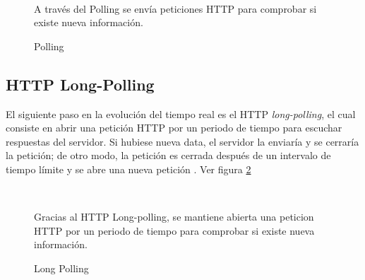 \begin{figure}[!h]
  \centering
  \\
  \caption{Polling}{A través del Polling se envía peticiones HTTP para comprobar si existe nueva información.}\label{fig:polling}
\end{figure}

\subsection{HTTP Long-Polling}
El siguiente paso en la evolución del tiempo real es el HTTP \emph{long-polling}, el cual consiste en abrir una petición HTTP por un periodo de tiempo para escuchar respuestas del servidor. Si hubiese nueva data, el servidor la enviaría y se cerraría la petición; de otro modo, la petición es cerrada después de un intervalo de tiempo límite y se abre una nueva petición \cite{lengstorf_realtime_2013}.  Ver figura \ref{fig:http_long_polling}
\begin{figure}[h]
  \centering
  \\
  \caption{Long Polling}{Gracias al HTTP Long-polling, se mantiene abierta una peticion HTTP por un periodo de tiempo para comprobar si existe nueva información.}\label{fig:http_long_polling}
\end{figure}

